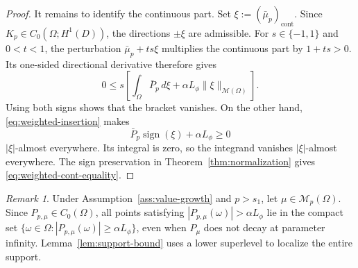 \documentclass[11pt]{amsart}
\theoremstyle{definition}
\theoremstyle{remark}
\newtheorem{remark}[theorem]{Remark}
\DeclareMathOperator{\cont}{cont}
\DeclareMathOperator{\sign}{sign}
\begin{document}
\begin{proof}
It remains to identify the continuous part. Set
$\xi:=(\bar\mu_p)_{\cont}$. Since
$K_p\in C_0(\Omega;H^1(D))$, the directions $\pm\xi$ are admissible. For
$s\in\{-1,1\}$ and $0<t<1$, the perturbation
$\bar\mu_p+ts\xi$ multiplies the continuous part by $1+ts>0$. Its
one-sided directional derivative therefore gives
\begin{equation*}
	0\le s\left[
	\int_\Omega\bar P_p\,d\xi
	+\alpha L_\phi\|\xi\|_{\mathcal M(\Omega)}
	\right].
\end{equation*}
Using both signs shows that the bracket vanishes. On the other hand,
\eqref{eq:weighted-insertion} makes
\begin{equation*}
	\bar P_p\sign(\xi)+\alpha L_\phi\ge0
\end{equation*}
$|\xi|$-almost everywhere. Its integral is zero, so the integrand vanishes
$|\xi|$-almost everywhere. The sign preservation in
Theorem~\ref{thm:normalization} gives \eqref{eq:weighted-cont-equality}.
\end{proof}

\begin{remark}
Under Assumption~\ref{ass:value-growth} and $p>s_1$, let
$\mu\in\mathcal M_p(\Omega)$. Since $P_{p,\mu}\in C_0(\Omega)$, all points
satisfying $|P_{p,\mu}(\omega)|>\alpha L_\phi$ lie in the compact set
$\{\omega\in\Omega:|P_{p,\mu}(\omega)|\ge\alpha L_\phi\}$, even when
$P_\mu$ does not decay at parameter infinity.
Lemma~\ref{lem:support-bound} uses a lower superlevel to
localize the entire support.
\end{remark}
\end{document}
